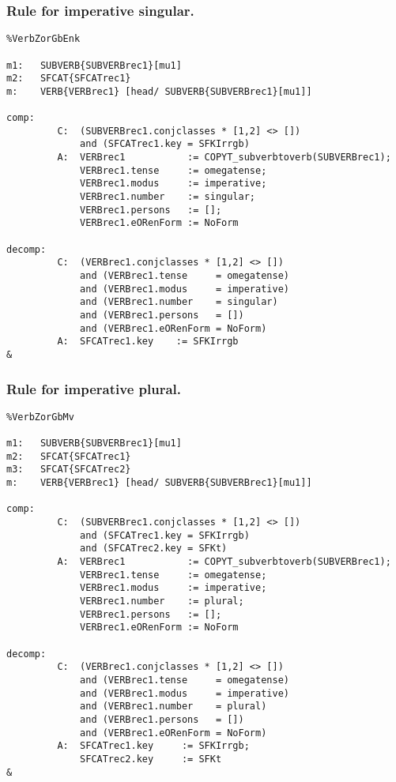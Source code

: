 \subsubsection{Rule for imperative singular.}
\begin{verbatim}
%VerbZorGbEnk 

m1:   SUBVERB{SUBVERBrec1}[mu1]
m2:   SFCAT{SFCATrec1}
m:    VERB{VERBrec1} [head/ SUBVERB{SUBVERBrec1}[mu1]]

comp:
         C:  (SUBVERBrec1.conjclasses * [1,2] <> [])
             and (SFCATrec1.key = SFKIrrgb)
         A:  VERBrec1           := COPYT_subverbtoverb(SUBVERBrec1);
             VERBrec1.tense     := omegatense;
             VERBrec1.modus     := imperative;
             VERBrec1.number    := singular;
             VERBrec1.persons   := [];
             VERBrec1.eORenForm := NoForm

decomp:
         C:  (VERBrec1.conjclasses * [1,2] <> []) 
             and (VERBrec1.tense     = omegatense) 
             and (VERBrec1.modus     = imperative) 
             and (VERBrec1.number    = singular) 
             and (VERBrec1.persons   = [])
             and (VERBrec1.eORenForm = NoForm)
         A:  SFCATrec1.key    := SFKIrrgb
&
\end{verbatim}
\newpage
\subsubsection{Rule for imperative plural.}
\begin{verbatim}
%VerbZorGbMv 

m1:   SUBVERB{SUBVERBrec1}[mu1]
m2:   SFCAT{SFCATrec1}
m3:   SFCAT{SFCATrec2}
m:    VERB{VERBrec1} [head/ SUBVERB{SUBVERBrec1}[mu1]]

comp:
         C:  (SUBVERBrec1.conjclasses * [1,2] <> [])
             and (SFCATrec1.key = SFKIrrgb)
             and (SFCATrec2.key = SFKt)
         A:  VERBrec1           := COPYT_subverbtoverb(SUBVERBrec1);
             VERBrec1.tense     := omegatense;
             VERBrec1.modus     := imperative;
             VERBrec1.number    := plural;
             VERBrec1.persons   := [];
             VERBrec1.eORenForm := NoForm

decomp:
         C:  (VERBrec1.conjclasses * [1,2] <> [])
             and (VERBrec1.tense     = omegatense) 
             and (VERBrec1.modus     = imperative)
             and (VERBrec1.number    = plural)
             and (VERBrec1.persons   = [])
             and (VERBrec1.eORenForm = NoForm)
         A:  SFCATrec1.key     := SFKIrrgb;
             SFCATrec2.key     := SFKt
&
\end{verbatim}
\newpage
